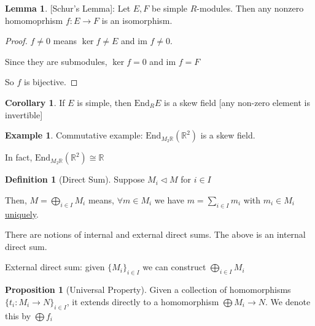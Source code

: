 \documentclass{article}
\theoremstyle{definition}
\newtheorem*{example}{Example}
\newtheorem*{definition}{Definition}
\newtheorem{proposition}[theorem]{Proposition}
\newtheorem{lemma}[theorem]{Lemma}
\newtheorem{corollary}[theorem]{Corollary}
\begin{document}
\begin{lemma}

    [Schur's Lemma]: Let \(E, F\) be simple \(R\)-modules. Then any nonzero homomoprhism \(f: E\to F\) is an isomorphism.

\end{lemma}

\begin{proof}
    \(f \neq 0\) means \(\ker f \neq E\) and \(\text{im } f \neq 0\).
    
    Since they are submodules, \(\ker f = 0\) and \(\text{im } f = F\) 

    So \(f\) is bijective.
\end{proof}

\begin{corollary}

    If \(E\) is simple, then \(\text{End}_R E\) is a skew field [any non-zero element is invertible]

\end{corollary}

\begin{example}

    Commutative example: \(\text{End}_{M_2\mathbb{R}}(\mathbb{R}^2)\) is a skew field.

    In fact, \(\text{End}_{M_2\mathbb{R}}(\mathbb{R}^2) \cong \mathbb{R}\) 

\end{example}



\begin{definition}[Direct Sum]
    Suppose \(M_i \triangleleft M\) for \(i \in I\) 

    Then, \(M = \bigoplus_{i\in I} M_i\) means, \(\forall m\in M_i\) we have \(m = \sum_{i\in I} m_i\) with \(m_i \in M_i\) \underline{uniquely}.

    There are notions of internal and external direct sums. The above is an internal direct sum.

    External direct sum: given \(\{ M_i \}_{i\in I}\) we can construct \(\bigoplus_{i\in I} M_i\) 

\end{definition}

\begin{proposition}
    [Universal Property] Given a collection of homomorphisms \(\{ t_i : M_i \to N \}_{i\in I}\), it extends directly to a homomorphism \(\bigoplus M_i \to N\). We denote this by \(\bigoplus f_i\)
\end{proposition}
\end{document}
